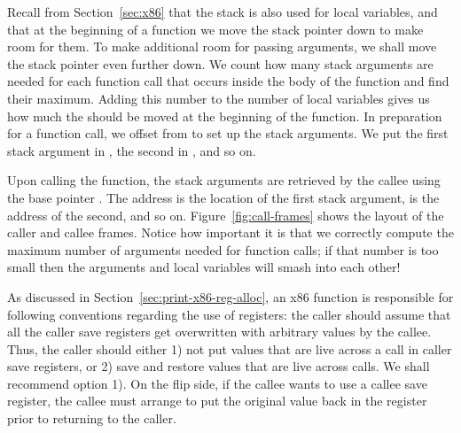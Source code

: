 \documentclass[11pt]{book}
\begin{document}
Recall from Section~\ref{sec:x86} that the stack is also used for
local variables, and that at the beginning of a function we move the
stack pointer  down to make room for them.  To make
additional room for passing arguments, we shall move the stack pointer
even further down. We count how many stack arguments are needed for
each function call that occurs inside the body of the function and
find their maximum. Adding this number to the number of local variables
gives us how much the  should be moved at the beginning of
the function. In preparation for a function call, we offset from
 to set up the stack arguments. We put the first stack
argument in , the second in , and so on.

Upon calling the function, the stack arguments are retrieved by the
callee using the base pointer . The address 
is the location of the first stack argument,  is the
address of the second, and so on. Figure~\ref{fig:call-frames} shows
the layout of the caller and callee frames. Notice how important it is
that we correctly compute the maximum number of arguments needed for
function calls; if that number is too small then the arguments and
local variables will smash into each other!

As discussed in Section~\ref{sec:print-x86-reg-alloc}, an x86 function
is responsible for following conventions regarding the use of
registers: the caller should assume that all the caller save registers
get overwritten with arbitrary values by the callee. Thus, the caller
should either 1) not put values that are live across a call in caller
save registers, or 2) save and restore values that are live across
calls. We shall recommend option 1).  On the flip side, if the callee
wants to use a callee save register, the callee must arrange to put
the original value back in the register prior to returning to the
caller.
\end{document}
